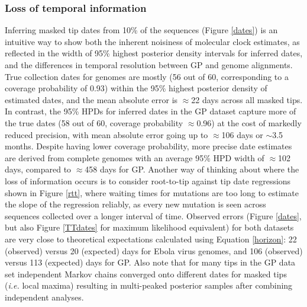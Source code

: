 \documentclass[11pt,oneside,letterpaper]{article}
\begin{document}
\subsubsection*{Loss of temporal information}

Inferring masked tip dates from 10\% of the sequences (Figure \ref{dates}) is an intuitive way to show both the inherent noisiness of molecular clock estimates, as reflected in the width of 95\% highest posterior density intervals for inferred dates, and the differences in temporal resolution between GP and genome alignments.
True collection dates for genomes are mostly (56 out of 60, corresponding to a coverage probability of 0.93) within the 95\% highest posterior density of estimated dates, and the mean absolute error is $\approx$22 days across all masked tips.
In contrast, the 95\% HPDs for inferred dates in the GP dataset capture more of the true dates (58 out of 60, coverage probability $\approx$0.96) at the cost of markedly reduced precision, with mean absolute error going up to $\approx$106 days or $\sim$3.5 months.
Despite having lower coverage probability, more precise date estimates are derived from complete genomes with an average 95\% HPD width of $\approx$102 days, compared to $\approx$458 days for GP.
Another way of thinking about where the loss of information occurs is to consider root-to-tip against tip date regressions shown in Figure \ref{rtt}, where waiting times for mutations are too long to estimate the slope of the regression reliably, as every new mutation is seen across sequences collected over a longer interval of time.
Observed errors (Figure \ref{dates}, but also Figure \ref{TTdates} for maximum likelihood equivalent) for both datasets are very close to theoretical expectations calculated using Equation \ref{horizon}: 22 (observed) versus 20 (expected) days for Ebola virus genomes, and 106 (observed) versus 113 (expected) days for GP.
Also note that for many tips in the GP data set independent Markov chains converged onto different dates for masked tips (\textit{i.e.} local maxima) resulting in multi-peaked posterior samples after combining independent analyses.
\end{document}
